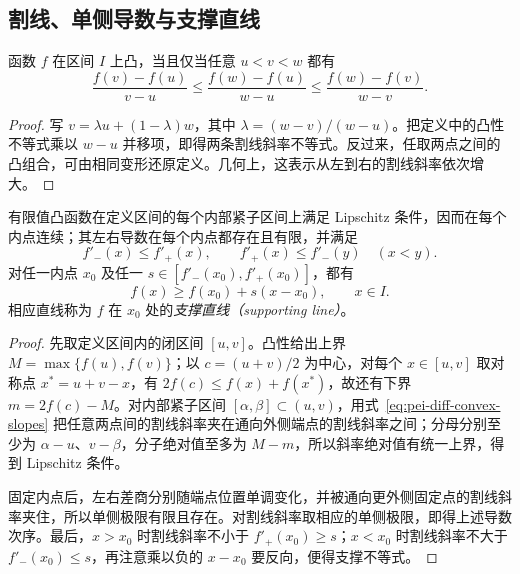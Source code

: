 \subsection{割线、单侧导数与支撑直线}

\begin{proposition}
\label{prop:pei-diff-convex-slopes}
函数 $f$ 在区间 $I$ 上凸，当且仅当任意 $u<v<w$ 都有
\begin{equation}
 \frac{f(v)-f(u)}{v-u}
 \le\frac{f(w)-f(u)}{w-u}
 \le\frac{f(w)-f(v)}{w-v}.
 \label{eq:pei-diff-convex-slopes}
\end{equation}
\end{proposition}
\begin{proof}
写 $v=\lambda u+(1-\lambda)w$，其中 $\lambda=(w-v)/(w-u)$。把定义中的凸性不等式乘以 $w-u$ 并移项，即得两条割线斜率不等式。反过来，任取两点之间的凸组合，可由相同变形还原定义。几何上，这表示从左到右的割线斜率依次增大。
\end{proof}

\begin{proposition}
\label{prop:pei-diff-convex-local-properties}
有限值凸函数在定义区间的每个内部紧子区间上满足 Lipschitz 条件，因而在每个内点连续；其左右导数在每个内点都存在且有限，并满足
\[
 f'_-(x)\le f'_+(x),\qquad
 f'_+(x)\le f'_-(y)\quad(x<y).
\]
对任一内点 $x_0$ 及任一
$s\in[f'_-(x_0),f'_+(x_0)]$，都有
\begin{equation}
 f(x)\ge f(x_0)+s(x-x_0),\qquad x\in I.
 \label{eq:pei-diff-supporting-line}
\end{equation}
相应直线称为 $f$ 在 $x_0$ 处的\emph{支撑直线（supporting line）}。
\end{proposition}
\begin{proof}
先取定义区间内的闭区间 $[u,v]$。凸性给出上界 $M=\max\{f(u),f(v)\}$；以 $c=(u+v)/2$ 为中心，对每个 $x\in[u,v]$ 取对称点 $x^*=u+v-x$，有 $2f(c)\le f(x)+f(x^*)$，故还有下界 $m=2f(c)-M$。对内部紧子区间 $[\alpha,\beta]\subset(u,v)$，用式~\eqref{eq:pei-diff-convex-slopes} 把任意两点间的割线斜率夹在通向外侧端点的割线斜率之间；分母分别至少为 $\alpha-u$、$v-\beta$，分子绝对值至多为 $M-m$，所以斜率绝对值有统一上界，得到 Lipschitz 条件。

固定内点后，左右差商分别随端点位置单调变化，并被通向更外侧固定点的割线斜率夹住，所以单侧极限有限且存在。对割线斜率取相应的单侧极限，即得上述导数次序。最后，$x>x_0$ 时割线斜率不小于 $f'_+(x_0)\ge s$；$x<x_0$ 时割线斜率不大于 $f'_-(x_0)\le s$，再注意乘以负的 $x-x_0$ 要反向，便得支撑不等式。
\end{proof}


